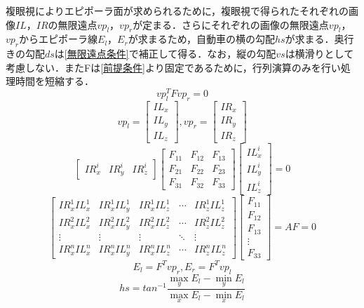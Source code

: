 \documentclass{jsarticle}
\begin{document}
複眼視によりエピポーラ面が求められるために，複眼視で得られたそれぞれの画像$IL$，$IR$の無限遠点$vp_{l}$，$vp_{r}$が定まる．さらにそれぞれの画像の無限遠点$vp_{l}$，$vp_{r}$からエピポーラ線$E_{l}$，$E_{r}$が求まるため，自動車の横の勾配$hs$が求まる．奥行きの勾配$ds$は\ref{無限遠点条件}で補正して得る．なお，縦の勾配$vs$は横滑りとして考慮しない．またFは\ref{前提条件}より固定であるために，行列演算のみを行い処理時間を短縮する．
\[
vp_l^T F vp_r = 0
\]
\[
vp_l = \begin{bmatrix} IL_x \\ IL_y \\ IL_z \end{bmatrix},
vp_r = \begin{bmatrix} IR_x \\ IR_y \\ IR_z \end{bmatrix}
\]
\[
\begin{bmatrix} IR_x^i & IR_y^i & IR_z^i \end{bmatrix}
\begin{bmatrix} F_{11} & F_{12} & F_{13} \\ F_{21} & F_{22} & F_{23} \\ F_{31} & F_{32} & F_{33} \end{bmatrix}
\begin{bmatrix} IL_x^i \\ IL_y^i \\ IL_z^i \end{bmatrix}
=0
\]
\[
\begin{bmatrix}
IR_x^1 IL_x^1 & IR_x^1 IL_y^1 & IR_x^1 IL_z^1 & \cdots & IR_z^1 IL_z^1 \\
IR_x^2 IL_x^2 & IR_x^2 IL_y^2 & IR_x^2 IL_z^2  & \cdots & IR_z^2 IL_z^2 \\
\vdots & \vdots & \vdots & \ddots & \vdots \\
IR_x^n IL_x^n & IR_x^n IL_y^n & IR_x^n IL_z^n  & \cdots & IR_z^n IL_z^n
\end{bmatrix}
\begin{bmatrix}
F_{11} \\ F_{12} \\ F_{13} \\ \vdots \\ F_{33}
\end{bmatrix}
=AF=0
\]
\[
E_{l} = F^T vp_{r}, E_{r} = F^T vp_{l}
\]
\[
hs = tan^{-1} \frac{\max_{y} E_l - \min_{y} E_l}{\max_{x} E_l - \min_{x} E_l}
\]
\begin{center}
\end{center}
\end{document}
